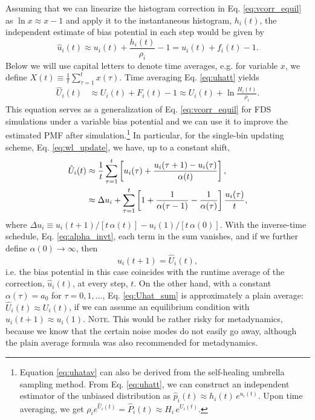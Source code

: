 \documentclass[preprint, superscriptaddress, floatfix]{revtex4-1}
\newcommand{\note}[1]{{\color{DarkGreen}\footnotesize \textsc{Note.} #1}}
\begin{document}
Assuming that we can linearize the histogram correction
in Eq. \eqref{eq:vcorr_equil} as
$\ln x \approx x - 1$ %
and apply it to the instantaneous histogram, $h_i(t)$,
the independent estimate of bias potential in each step
would be given by
%
\begin{equation}
  \hat u_i(t) \approx u_i(t) + \frac{ h_i(t) } { \rho_i } - 1
  = u_i(t) + f_i(t) - 1
  .
  \label{eq:uhatt}
\end{equation}
%
Below we will use capital letters to denote
time averages, e.g. for variable $x$, we define
$X(t) \equiv \frac{1}{t} \sum_{\tau=1}^t x(\tau)$.
%
Time averaging Eq. \eqref{eq:uhatt} yields
\begin{align}
  \hat U_i(t)
  &\approx
  U_i (t)
  + F_i(t) - 1
  \approx
  U_i(t)
  + \ln \frac{ H_i(t) } { \rho_i }
  .
  \label{eq:uhatav}
\end{align}
%
This equation serves as
a generalization of Eq. \eqref{eq:vcorr_equil}
for FDS simulations under a variable bias potential
and we can use it to improve the estimated PMF
after simulation.\footnote{Equation \eqref{eq:uhatav}
  can also be derived
  from the self-healing umbrella sampling method\cite{marsili2006}.
  From Eq. \eqref{eq:uhatt},
  we can construct an independent estimator
  of the unbiased distribution as
  $\hat p_i(t) \approx h_i(t) \, e^{ u_i(t) }$.
  Upon time averaging, we get
  $\rho_i e^{\hat U_i(t)} = \hat P_i(t) \approx H_i \, e^{ U_i(t) }$.}
%
In particular, for the single-bin updating scheme,
Eq. \eqref{eq:wl_update},
we have, up to a constant shift,
%
\begin{align}
  \hat U_i(t)
  &\approx
  \frac{1}{t} \sum_{\tau=1}^t
  \left[
    u_i(\tau) +
    \frac{ u_i(\tau + 1) - u_i(\tau) } { \alpha(t) }
  \right]
  ,
  \notag
  \\
  &\approx
  \Delta u_i
  +
  \sum_{\tau=1}^t
  \left[
    1 + \frac{1}{\alpha(\tau - 1)} - \frac{1}{\alpha(\tau)}
  \right]
  \frac{ u_i(\tau) } {t}
  ,
  \label{eq:Uhat_sum}
\end{align}
where
$\Delta u_i \equiv u_i(t+1) /[t \, \alpha(t)]
- u_i(1)/[t \, \alpha(0)]$.
%
With the inverse-time schedule, Eq. \eqref{eq:alpha_invt},
each term in the sum vanishes,
and if we further define $\alpha(0) \to \infty$,
then
$$
u_i(t+1) = \hat U_i(t),
$$
i.e. the bias potential in this case coincides with
the runtime average of the correction, $\hat u_i(t)$,
at every step, $t$.
%
On the other hand,
with a constant $\alpha(\tau) = a_0$ for $\tau = 0, 1, \dots$,
Eq. \eqref{eq:Uhat_sum} is approximately a plain average\cite{zhou2005}:
$\hat U_i(t) \approx U_i(t)$,
if we can assume an equilibrium condition
with $u_i(t+1) \approx u_i(1)$.
\note{This would be rather risky for metadynamics,
because we know that the certain noise modes
do not easily go away, although the plain average
formula was also recommended for metadynamics.}
\end{document}
